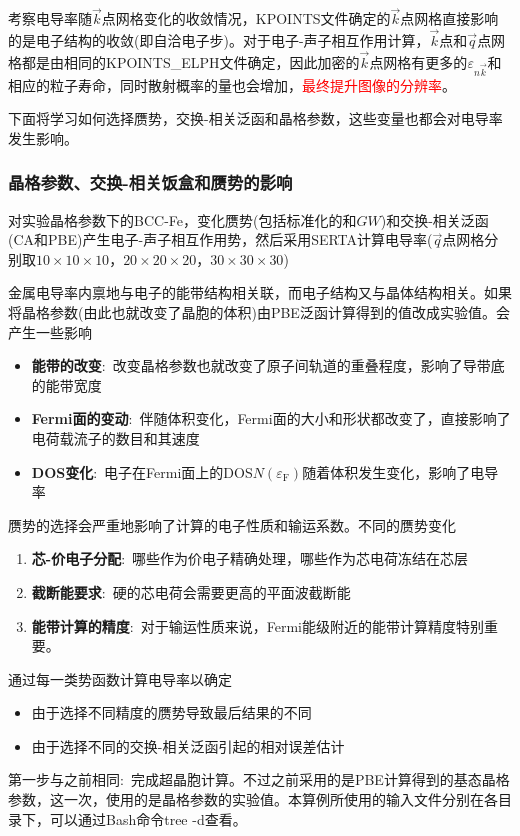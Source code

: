 {考察电导率随$\vec k$点网格变化的收敛情况，\textrm{KPOINTS}文件确定的$\vec k$点网格直接影响的是电子结构的收敛(即自洽电子步)。对于电子-声子相互作用计算，$\vec k$点和$\vec q$点网格都是由相同的\textrm{KPOINTS\_ELPH}文件确定，因此加密的$\vec k$点网格有更多的$\varepsilon_{n\vec k}$和相应的粒子寿命，同时散射概率的量也会增加，\textcolor{red}{最终提升图像的分辨率}。

下面将学习如何选择赝势，交换-相关泛函和晶格参数，这些变量也都会对电导率发生影响。

\subsubsection{晶格参数、交换-相关饭盒和赝势的影响}
对实验晶格参数下的\textrm{BCC-Fe}，变化赝势(包括标准化的和$GW$)和交换-相关泛函(\textrm{CA}和\textrm{PBE})产生电子-声子相互作用势，然后采用\textrm{SERTA}计算电导率($\vec q$点网格分别取$10\times10\times10$，$20\times20\times20$，$30\times30\times30$)

金属电导率内禀地与电子的能带结构相关联，而电子结构又与晶体结构相关。如果将晶格参数(由此也就改变了晶胞的体积)由\textrm{PBE}泛函计算得到的值改成实验值。会产生一些影响
\begin{itemize}
	\item \textbf{能带的改变}:~改变晶格参数也就改变了原子间轨道的重叠程度，影响了导带底的能带宽度
	\item \textbf{Fermi面的变动}:~伴随体积变化，\textrm{Fermi}面的大小和形状都改变了，直接影响了电荷载流子的数目和其速度
	\item \textbf{DOS变化}:~电子在\textrm{Fermi}面上的\textrm{DOS}$N(\varepsilon_{\mathrm{F}})$随着体积发生变化，影响了电导率
\end{itemize}
赝势的选择会严重地影响了计算的电子性质和输运系数。不同的赝势变化
\begin{enumerate}
	\item \textbf{芯-价电子分配}:~哪些作为价电子精确处理，哪些作为芯电荷冻结在芯层
	\item \textbf{截断能要求}:~硬的芯电荷会需要更高的平面波截断能
	\item \textbf{能带计算的精度}:~对于输运性质来说，\textrm{Fermi}能级附近的能带计算精度特别重要。
\end{enumerate}
通过每一类势函数计算电导率以确定
\begin{itemize}
	\item 由于选择不同精度的赝势导致最后结果的不同
	\item 由于选择不同的交换-相关泛函引起的相对误差估计
\end{itemize}
第一步与之前相同:~完成超晶胞计算。不过之前采用的是\textrm{PBE}计算得到的基态晶格参数，这一次，使用的是晶格参数的实验值。本算例所使用的输入文件分别在各目录下，可以通过\textrm{Bash}命令\textrm{tree -d}查看。

}

